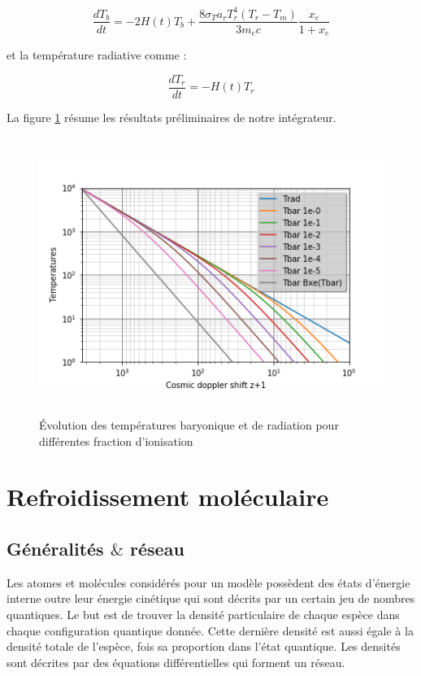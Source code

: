 \documentclass[10pt, a4paper]{report}
\numberwithin{equation}{subsection}
\begin{document}
\begin{equation} \label{eq:EERT}
\boxed{\frac{dT_b}{dt} = -2H(t)T_b+\frac{8\sigma_Ta_rT_r^4(T_r-T_m)}{3m_ec}\frac{x_e}{1+x_e}}
\end{equation}

et la température radiative comme :

\begin{equation} \label{eq:EERR}
\boxed{\frac{dT_r}{dt} = -H(t)T_r}
\end{equation}

La figure \ref{fig:T} résume les résultats préliminaires de notre intégrateur.

\begin{figure}[]
\centering
\includegraphics[width=12.0cm,height=9cm]{Temperatures.png}
\caption{\uppercase{é}volution des températures baryonique et de radiation pour différentes fraction d'ionisation}
\label{fig:T}
\end{figure}

\chapter{Refroidissement moléculaire}
\section{Généralités $\&$ réseau}
Les atomes et molécules considérés pour un modèle possèdent des états d'énergie interne outre leur énergie cinétique qui sont décrits par un certain jeu de nombres quantiques. Le but est de trouver la densité particulaire de chaque espèce dans chaque configuration quantique donnée. Cette dernière densité est aussi égale à la densité totale de l'espèce, fois sa proportion dans l'état quantique. Les densités sont décrites par des équations différentielles qui forment un réseau.\bigskip
\large
\end{document}
